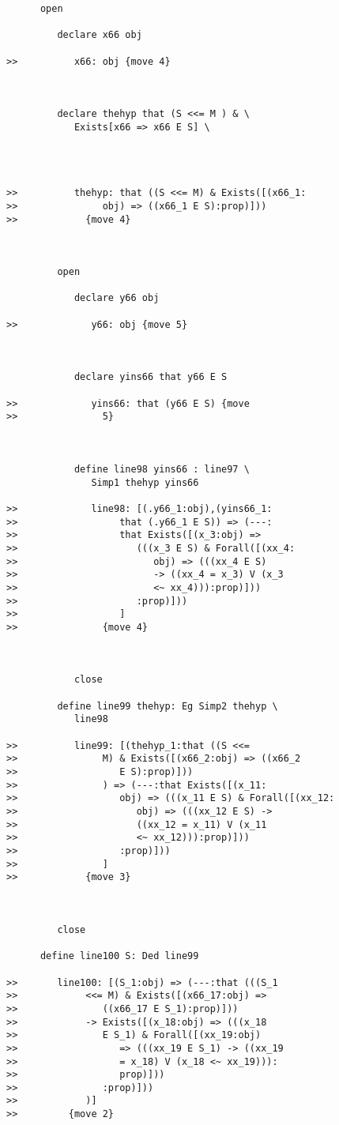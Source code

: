 \documentclass[12pt]{article}
\begin{document}
\begin{verbatim}
      open

         declare x66 obj

>>          x66: obj {move 4}



         declare thehyp that (S <<= M ) & \
            Exists[x66 => x66 E S] \
            



>>          thehyp: that ((S <<= M) & Exists([(x66_1:
>>               obj) => ((x66_1 E S):prop)]))
>>            {move 4}



         open

            declare y66 obj

>>             y66: obj {move 5}



            declare yins66 that y66 E S

>>             yins66: that (y66 E S) {move
>>               5}



            define line98 yins66 : line97 \
               Simp1 thehyp yins66

>>             line98: [(.y66_1:obj),(yins66_1:
>>                  that (.y66_1 E S)) => (---:
>>                  that Exists([(x_3:obj) =>
>>                     (((x_3 E S) & Forall([(xx_4:
>>                        obj) => (((xx_4 E S)
>>                        -> ((xx_4 = x_3) V (x_3
>>                        <~ xx_4))):prop)]))
>>                     :prop)]))
>>                  ]
>>               {move 4}



            close

         define line99 thehyp: Eg Simp2 thehyp \
            line98

>>          line99: [(thehyp_1:that ((S <<=
>>               M) & Exists([(x66_2:obj) => ((x66_2
>>                  E S):prop)]))
>>               ) => (---:that Exists([(x_11:
>>                  obj) => (((x_11 E S) & Forall([(xx_12:
>>                     obj) => (((xx_12 E S) ->
>>                     ((xx_12 = x_11) V (x_11
>>                     <~ xx_12))):prop)]))
>>                  :prop)]))
>>               ]
>>            {move 3}



         close

      define line100 S: Ded line99

>>       line100: [(S_1:obj) => (---:that (((S_1
>>            <<= M) & Exists([(x66_17:obj) =>
>>               ((x66_17 E S_1):prop)]))
>>            -> Exists([(x_18:obj) => (((x_18
>>               E S_1) & Forall([(xx_19:obj)
>>                  => (((xx_19 E S_1) -> ((xx_19
>>                  = x_18) V (x_18 <~ xx_19))):
>>                  prop)]))
>>               :prop)]))
>>            )]
>>         {move 2}




\end{verbatim}
\end{document}
